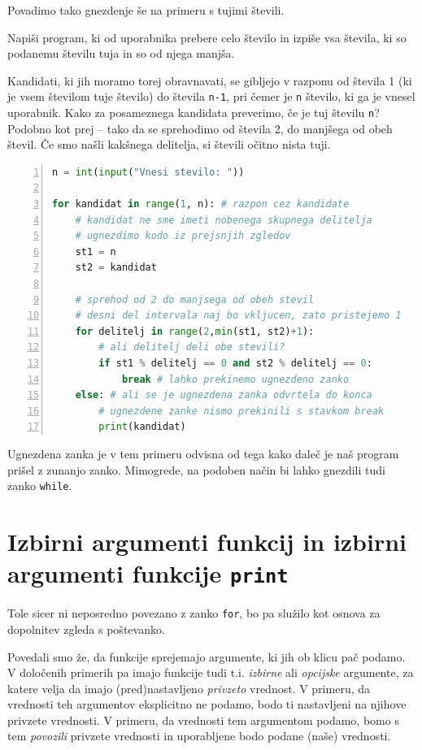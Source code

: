 Povadimo tako gnezdenje še na primeru s tujimi števili.
\begin{zgled}
Napiši program, ki od uporabnika prebere celo število in izpiše vsa števila, ki so podanemu številu tuja in so od njega manjša. 
\end{zgled}
\begin{resitev}
Kandidati, ki jih moramo torej obravnavati, se gibljejo v razponu od števila 1 (ki je vsem številom tuje število) do števila \texttt{n-1}, pri čemer je \texttt{n} število, ki ga je vnesel uporabnik. Kako za posameznega kandidata preverimo, če je tuj številu \texttt{n}? Podobno kot prej -- tako da se sprehodimo od števila 2, do manjšega od obeh števil. Če smo našli kakšnega delitelja, si števili očitno nista tuji.
\begin{lstlisting}[language=Python, showstringspaces=false,numbers=left]
n = int(input("Vnesi stevilo: "))

for kandidat in range(1, n): # razpon cez kandidate
    # kandidat ne sme imeti nobenega skupnega delitelja
    # ugnezdimo kodo iz prejsnjih zgledov
    st1 = n
    st2 = kandidat
    
    # sprehod od 2 do manjsega od obeh stevil
    # desni del intervala naj bo vkljucen, zato pristejemo 1
    for delitelj in range(2,min(st1, st2)+1):
        # ali delitelj deli obe stevili?
        if st1 % delitelj == 0 and st2 % delitelj == 0:
            break # lahko prekinemo ugnezdeno zanko
    else: # ali se je ugnezdena zanka odvrtela do konca
        # ugnezdene zanke nismo prekinili s stavkom break
        print(kandidat)
\end{lstlisting}
\end{resitev}
Ugnezdena zanka je v tem primeru odvisna od tega kako daleč je naš program prišel z zunanjo zanko. Mimogrede, na podoben način bi lahko gnezdili tudi zanko \texttt{while}. 


\section{Izbirni argumenti funkcij in izbirni argumenti funkcije \texttt{print}}

Tole sicer ni neposredno povezano z zanko \texttt{for}, bo pa služilo kot osnova za dopolnitev zgleda s poštevanko. 

Povedali smo že, da funkcije sprejemajo argumente, ki jih ob klicu pač podamo. V določenih primerih pa imajo funkcije tudi t.i. \emph{izbirne} ali \emph{opcijske} argumente, za katere velja da imajo (pred)nastavljeno \emph{privzeto} vrednost. V primeru, da vrednosti teh argumentov eksplicitno ne podamo, bodo ti nastavljeni na njihove privzete vrednosti. V primeru, da vrednosti tem argumentom podamo, bomo s tem \emph{povozili} privzete vrednosti in uporabljene bodo podane (naše) vrednosti.

